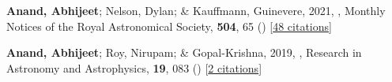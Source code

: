 \item[{\color{numcolor}\scriptsize2}] \textbf{Anand, Abhijeet}; Nelson, Dylan; \& Kauffmann, Guinevere, 2021, , Monthly Notices of the Royal Astronomical Society, \textbf{504}, 65 () [\href{https://ui.adsabs.harvard.edu/abs/2021MNRAS.504...65A}{48 citations}]

\item[{\color{numcolor}\scriptsize1}] \textbf{Anand, Abhijeet}; Roy, Nirupam; \& Gopal-Krishna, 2019, , Research in Astronomy and Astrophysics, \textbf{19}, 083 () [\href{https://ui.adsabs.harvard.edu/abs/2019RAA....19...83A}{2 citations}]